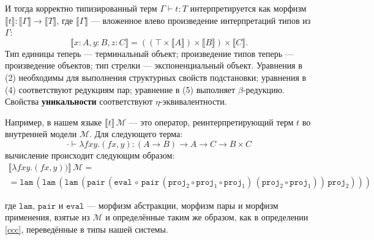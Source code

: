 И тогда корректно типизированный терм
$\Gamma\vdash t:T$ интерпретируется как морфизм
$\llbracket t\rrbracket:
\llbracket\Gamma\rrbracket\to\llbracket T\rrbracket$,
где $\llbracket\Gamma\rrbracket$ --- вложенное влево
произведение интерпретаций типов из $\Gamma$:
\[
    \llbracket x:A,y:B,z:C\rrbracket=
    ((\top\times\llbracket A\rrbracket)
    \times\llbracket B\rrbracket)
    \times\llbracket C\rrbracket.
\]
Тип единицы теперь --- терминальный объект;
произведение типов теперь --- произведение объектов;
тип стрелки --- экспоненциальный объект. Уравнения в
(2) необходимы для выполнения структурных свойств
подстановки; уравнения в (4) соответствуют редукциям
пар; уравнение в (5) выполняет $\beta$-редукцию.
Свойства \textbf{уникальности} соответствуют
$\eta$-эквивалентности.

Например, в нашем языке
$\llbracket t\rrbracket\,\mathcal{M}$ --- это оператор,
реинтерпретирующий терм $t$ во внутренней модели
$\mathcal{M}$. Для следующего терма:
\[
\cdot\vdash\lambda f x y. (f x, y):
(A\to B)\to A\to C\to B\times C
\]
вычисление происходит следующим образом:
\begin{multline*}
    \llbracket\lambda f x y. (f x, y))\rrbracket\,
    \mathcal{M}=\\=
    \mathtt{lam}\,(\mathtt{lam}\,(\mathtt{lam}\,(
    \mathtt{pair}\,
    (\mathtt{eval}\,\circ\,\mathtt{pair}\,
    (\mathtt{proj}_2\circ\mathtt{proj}_1
    \circ\mathtt{proj}_1
    )\,
    (\mathtt{proj}_2\circ\mathtt{proj}_1)
    )\,
    \mathtt{proj}_2
    )))
\end{multline*}

где $\mathtt{lam}$, $\mathtt{pair}$ и $\mathtt{eval}$
--- морфизм абстракции, морфизм пары и морфизм
применения, взятые из $\mathcal{M}$ и определённые
таким же образом, как в определении \ref{ccc},
переведённые в типы нашей системы.

